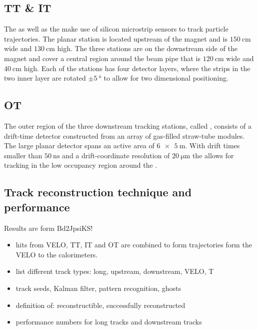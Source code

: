 \subsection{TT \& IT}
\label{sec:lhcb_experiment:tracking:ttit}

The \TT as well as the \IT make use of silicon microstrip sensors to track
particle trajectories. The planar \TT station is located upstream of the magnet
and is $\SI{150}{\centi\metre}$ wide and $\SI{130}{\centi\metre}$ high. The
three \IT stations are on the downstream side of the magnet and cover a central
region around the beam pipe that is $\SI{120}{\centi\metre}$ wide and
$\SI{40}{\centi\metre}$ high. Each of the stations has four detector layers,
where the strips in the two inner layer are rotated $\pm\SI{5}{\degree}$ to
allow for two dimensional positioning.

\subsection{OT}
\label{sec:lhcb_experiment:tracking:ot}

The outer region of the three downstream tracking stations, called \OT, consists
of a drift-time detector constructed from an array of gas-filled straw-tube
modules. The large planar detector spans an active area of $\SI[product-units =
power]{6 x 5}{\metre}$. With drift times smaller than $\SI{50}{\nano\second}$
and a drift-coordinate resolution of $\SI{20}{\micro\metre}$ the \OT allows for
tracking in the low occupancy region around the \IT.

\subsection{Track reconstruction technique and performance}
Results are form Bd2JpsiKS!
\begin{itemize}
  \item hits from VELO, TT, IT and OT are combined to form trajectories form the VELO to the calorimeters. 
  \item list different track types: long, upstream, downstream, VELO, T
  \item track seeds, Kalman filter, pattern recognition, ghosts
  \item definition of: reconstructible, successfully reconstructed
  \item performance numbers for long tracks and downstream tracks
\end{itemize}

